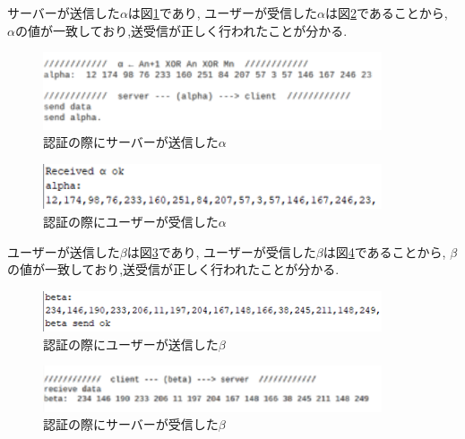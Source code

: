 サーバーが送信した$\alpha$は図\ref{fig:ninsyo_server_alpha}であり,
ユーザーが受信した$\alpha$は図\ref{fig:ninsyo_uv_alpha}であることから,
$\alpha$の値が一致しており,送受信が正しく行われたことが分かる.
\begin{figure}[H]
\begin{center}
	\includegraphics[width=10cm]{ninsyo_server_alpha.png}
	\caption{認証の際にサーバーが送信した$\alpha$}
	\label{fig:ninsyo_server_alpha}
\end{center}
\end{figure}
\begin{figure}[H]
\begin{center}
	\includegraphics[width=10cm]{ninsyo_uv_alpha.png}
	\caption{認証の際にユーザーが受信した$\alpha$}
	\label{fig:ninsyo_uv_alpha}
\end{center}
\end{figure}

ユーザーが送信した$\beta$は図\ref{fig:ninsyo_uv_beta}であり,
ユーザーが受信した$\beta$は図\ref{fig:ninsyo_server_beta}であることから,
$\beta$の値が一致しており,送受信が正しく行われたことが分かる.

\begin{figure}[H]
\begin{center}
	\includegraphics[width=10cm]{ninsyo_uv_beta.png}
	\caption{認証の際にユーザーが送信した$\beta$}
	\label{fig:ninsyo_uv_beta}
\end{center}
\end{figure}
\begin{figure}[H]
\begin{center}
	\includegraphics[width=10cm]{ninsyo_server_beta.png}
	\caption{認証の際にサーバーが受信した$\beta$}
	\label{fig:ninsyo_server_beta}
\end{center}
\end{figure}


